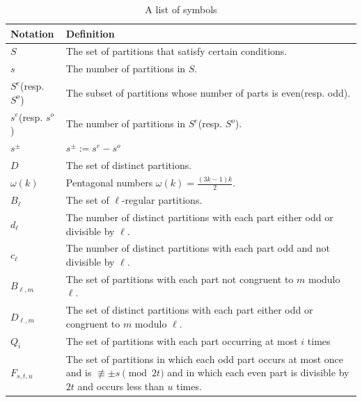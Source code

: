 \documentclass[12pt,reqno]{amsart}
\numberwithin{equation}{section}
\begin{document}
	\begin{table}[H]
			\centering  
	
	\begin{tabular}{|p{4cm}<{\centering} |p{11cm}|}  
		
		\hline
		Notation & Definition \\
		\hline
		$S$ & The set of partitions that satisfy certain conditions.   \\
		\hline
		$s$ & The number of partitions in $S$.\\
		\hline
		$S^e$(resp. $S^o$) & The subset of partitions whose number of parts is even(resp. odd).\\
		\hline
		$s^e$(resp. $s^o$) & The number of partitions in $S^e$(resp. $S^o$).\\
		\hline  
		$s^{\pm}$ & $s^{\pm}:=s^e-s^o$\\
		\hline
		$D$ & The set of distinct partitions. \\
		\hline
		
		
		
		
		
		
		$\omega(k)$ & Pentagonal numbers $\omega(k)=\frac{(3k-1)k}{2}.$ \\
		\hline
		$B_{\ell}$ & The set of $\ell$-regular partitions. \\
		\hline
		
		
		
		
		
		
		$d_{\ell}$ & The number of distinct partitions with each part either odd or divisible by $\ell$. \\
		\hline
		$c_{\ell}$ & The number of distinct partitions with each part odd and not divisible by $\ell$. \\
		\hline
		$B_{\ell,m}$ & The set of partitions with each part not congruent to $m$ modulo $\ell$. \\
		\hline
		
		
		
		
		
		
		$D_{\ell,m}$ & The set of distinct partitions with each part either odd or congruent to $m$ modulo $\ell$. \\
		\hline
		
		
		$Q_{i}$ & The set of partitions with each part occurring at most $i$ times \\
		\hline
		
		
		
		
		
		
		
		
		$F_{s,t,u}$ & The set of partitions in which each odd part occurs at most once and is $\not\equiv \pm s \pmod{2t}$ and in which each even part is divisible by $2t$ and occurs less than $u$ times. \\
		\hline
		
		
	\end{tabular}
	\smallskip
	\caption{A list of symbols}\label{tab:Symbols}  
	\end{table}
\end{document}
